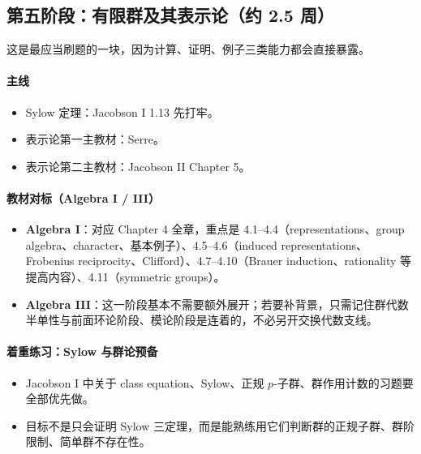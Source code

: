 \documentclass[12pt,a4paper]{ctexart}
\begin{document}
\subsection{第五阶段：有限群及其表示论（约 2.5 周）}

这是最应当刷题的一块，因为计算、证明、例子三类能力都会直接暴露。

\paragraph{主线}
\begin{itemize}
  \item Sylow 定理：Jacobson I 1.13 先打牢。
  \item 表示论第一主教材：Serre。
  \item 表示论第二主教材：Jacobson II Chapter 5。
\end{itemize}

\paragraph{教材对标（Algebra I / III）}
\begin{itemize}
  \item \textbf{Algebra I}：对应 Chapter 4 全章，重点是 4.1--4.4（representations、group algebra、character、基本例子）、4.5--4.6（induced representations、Frobenius reciprocity、Clifford）、4.7--4.10（Brauer induction、rationality 等提高内容）、4.11（symmetric groups）。
  \item \textbf{Algebra III}：这一阶段基本不需要额外展开；若要补背景，只需记住群代数半单性与前面环论阶段、模论阶段是连着的，不必另开交换代数支线。
\end{itemize}

\paragraph{着重练习：Sylow 与群论预备}
\begin{itemize}
  \item Jacobson I 中关于 class equation、Sylow、正规 \(p\)-子群、群作用计数的习题要全部优先做。
  \item 目标不是只会证明 Sylow 三定理，而是能熟练用它们判断群的正规子群、群阶限制、简单群不存在性。
\end{itemize}
\end{document}
